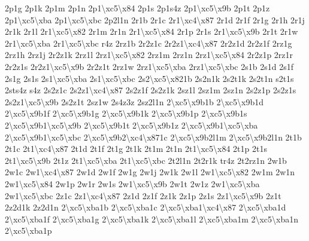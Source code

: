\begin{DoxyCompactItemize}
2p1g 2p1k 2p1m 2p1n 2p1\textbackslash{}xc5\textbackslash{}x84 2p1s 2p1s4z 2p1\textbackslash{}xc5\textbackslash{}x9b 2p1t 2p1z 2p1\textbackslash{}xc5\textbackslash{}xba 2p1\textbackslash{}xc5\textbackslash{}xbc 2p2l1n 2r1b 2r1c 2r1\textbackslash{}xc4\textbackslash{}x87 2r1d 2r1f 2r1g 2r1h 2r1j 2r1k 2r1l 2r1\textbackslash{}xc5\textbackslash{}x82 2r1m 2r1n 2r1\textbackslash{}xc5\textbackslash{}x84 2r1p 2r1s 2r1\textbackslash{}xc5\textbackslash{}x9b 2r1t 2r1w 2r1\textbackslash{}xc5\textbackslash{}xba 2r1\textbackslash{}xc5\textbackslash{}xbc r4z 2rz1b 2r2z1c 2r2z1\textbackslash{}xc4\textbackslash{}x87 2r2z1d 2r2z1f 2rz1g 2rz1h 2rz1j 2r2z1k 2rz1l 2rz1\textbackslash{}xc5\textbackslash{}x82 2rz1m 2rz1n 2rz1\textbackslash{}xc5\textbackslash{}x84 2r2z1p 2rz1r 2r2z1s 2r2z1\textbackslash{}xc5\textbackslash{}x9b 2r2z1t 2rz1w 2rz1\textbackslash{}xc5\textbackslash{}xba 2rz1\textbackslash{}xc5\textbackslash{}xbc 2s1b 2s1d 2s1f 2s1g 2s1s 2s1\textbackslash{}xc5\textbackslash{}xba 2s1\textbackslash{}xc5\textbackslash{}xbc 2s2\textbackslash{}xc5\textbackslash{}x821b 2s2n1k 2s2t1k 2s2t1n s2t1s 2sts4z s4z 2s2z1c 2s2z1\textbackslash{}xc4\textbackslash{}x87 2s2z1f 2s2z1k 2sz1l 2sz1m 2sz1n 2s2z1p 2s2z1s 2s2z1\textbackslash{}xc5\textbackslash{}x9b 2s2z1t 2sz1w 2s4z3z 2sz2l1n 2\textbackslash{}xc5\textbackslash{}x9b1b 2\textbackslash{}xc5\textbackslash{}x9b1d 2\textbackslash{}xc5\textbackslash{}x9b1f 2\textbackslash{}xc5\textbackslash{}x9b1g 2\textbackslash{}xc5\textbackslash{}x9b1k 2\textbackslash{}xc5\textbackslash{}x9b1p 2\textbackslash{}xc5\textbackslash{}x9b1s 2\textbackslash{}xc5\textbackslash{}x9b1\textbackslash{}xc5\textbackslash{}x9b 2\textbackslash{}xc5\textbackslash{}x9b1t 2\textbackslash{}xc5\textbackslash{}x9b1z 2\textbackslash{}xc5\textbackslash{}x9b1\textbackslash{}xc5\textbackslash{}xba 2\textbackslash{}xc5\textbackslash{}x9b1\textbackslash{}xc5\textbackslash{}xbc 2\textbackslash{}xc5\textbackslash{}x9b2\textbackslash{}xc4\textbackslash{}x871c 2\textbackslash{}xc5\textbackslash{}x9b2l1m 2\textbackslash{}xc5\textbackslash{}x9b2l1n 2t1b 2t1c 2t1\textbackslash{}xc4\textbackslash{}x87 2t1d 2t1f 2t1g 2t1k 2t1m 2t1n 2t1\textbackslash{}xc5\textbackslash{}x84 2t1p 2t1s 2t1\textbackslash{}xc5\textbackslash{}x9b 2t1z 2t1\textbackslash{}xc5\textbackslash{}xba 2t1\textbackslash{}xc5\textbackslash{}xbc 2t2l1n 2t2r1k tr4z 2t2rz1n 2w1b 2w1c 2w1\textbackslash{}xc4\textbackslash{}x87 2w1d 2w1f 2w1g 2w1j 2w1k 2w1l 2w1\textbackslash{}xc5\textbackslash{}x82 2w1m 2w1n 2w1\textbackslash{}xc5\textbackslash{}x84 2w1p 2w1r 2w1s 2w1\textbackslash{}xc5\textbackslash{}x9b 2w1t 2w1z 2w1\textbackslash{}xc5\textbackslash{}xba 2w1\textbackslash{}xc5\textbackslash{}xbc 2z1c 2z1\textbackslash{}xc4\textbackslash{}x87 2z1d 2z1f 2z1k 2z1p 2z1s 2z1\textbackslash{}xc5\textbackslash{}x9b 2z1t 2z2d1k 2z2d1n 2\textbackslash{}xc5\textbackslash{}xba1b 2\textbackslash{}xc5\textbackslash{}xba1c 2\textbackslash{}xc5\textbackslash{}xba1\textbackslash{}xc4\textbackslash{}x87 2\textbackslash{}xc5\textbackslash{}xba1d 2\textbackslash{}xc5\textbackslash{}xba1f 2\textbackslash{}xc5\textbackslash{}xba1g 2\textbackslash{}xc5\textbackslash{}xba1k 2\textbackslash{}xc5\textbackslash{}xba1l 2\textbackslash{}xc5\textbackslash{}xba1m 2\textbackslash{}xc5\textbackslash{}xba1n 2\textbackslash{}xc5\textbackslash{}xba1p 
\end{DoxyCompactItemize}
